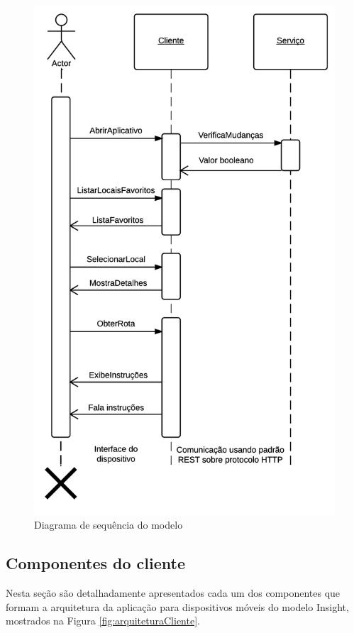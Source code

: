 \documentclass[english,brazilian]{UNISINOSmonografia}
\begin{document}
\begin{figure}[!ht]
	\caption{Diagrama de sequência do modelo}
	\label{fig:diagramaSequencia}
	\centering%
	\begin{minipage}{.6\textwidth}
		\includegraphics[width=\textwidth]{imgs/diagramaSequencia.png}
	\end{minipage}
\end{figure}


	\subsection{Componentes do cliente}
Nesta seção são detalhadamente apresentados cada um dos componentes que formam a arquitetura da aplicação para dispositivos móveis do modelo Insight, mostrados na Figura \ref{fig:arquiteturaCliente}.
\end{document}

